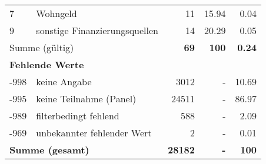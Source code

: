 \begin{longtable}{lXrrr}
     7 &
     \multicolumn{1}{X}{ Wohngeld   } &


       \num{11} &
       \num[round-mode=places,round-precision=2]{15.94} &
         \num[round-mode=places,round-precision=2]{0.04} \\

     9 &
     \multicolumn{1}{X}{ sonstige Finanzierungsquellen   } &


       \num{14} &
       \num[round-mode=places,round-precision=2]{20.29} &
         \num[round-mode=places,round-precision=2]{0.05} \\
     \midrule
     \multicolumn{2}{l}{Summe (gültig)} &
       \textbf{\num{69}} &
     \textbf{\num{100}} &
       \textbf{\num[round-mode=places,round-precision=2]{0.24}} \\
     \multicolumn{5}{l}{\textbf{Fehlende Werte}}\\
       -998 &
       keine Angabe &
         \num{3012} &
        - &
         \num[round-mode=places,round-precision=2]{10.69} \\
       -995 &
       keine Teilnahme (Panel) &
         \num{24511} &
        - &
         \num[round-mode=places,round-precision=2]{86.97} \\
       -989 &
       filterbedingt fehlend &
         \num{588} &
        - &
         \num[round-mode=places,round-precision=2]{2.09} \\
       -969 &
       unbekannter fehlender Wert &
         \num{2} &
        - &
         \num[round-mode=places,round-precision=2]{0.01} \\
     \midrule
     \multicolumn{2}{l}{\textbf{Summe (gesamt)}} &
          \textbf{\num{28182}} &
        \textbf{-} &
        \textbf{\num{100}} \\
     \bottomrule
     \end{longtable}
     
